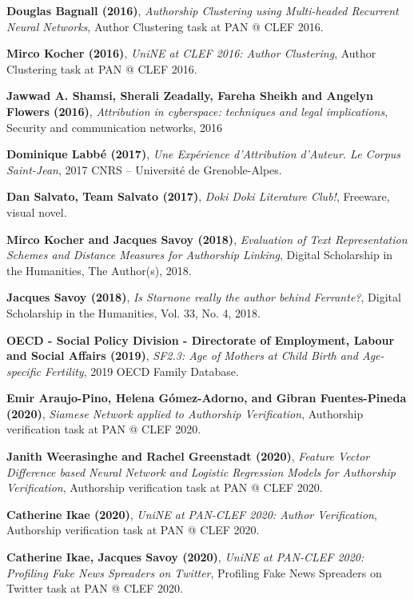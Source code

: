 \begin{thebibliography}{9}
\textbf{Douglas Bagnall (2016)},
\textit{Authorship Clustering using Multi-headed Recurrent Neural Networks},
Author Clustering task at PAN @ CLEF 2016.

\textbf{Mirco Kocher (2016)},
\textit{UniNE at CLEF 2016: Author Clustering},
Author Clustering task at PAN @ CLEF 2016.

\textbf{Jawwad A. Shamsi, Sherali Zeadally, Fareha Sheikh and Angelyn Flowers (2016)},
\textit{Attribution in cyberspace: techniques and legal implications},
Security and communication networks, 2016

\textbf{Dominique Labbé (2017)},
\textit{Une Expérience d’Attribution d’Auteur. Le Corpus Saint-Jean},
2017 CNRS – Université de Grenoble-Alpes.

\textbf{Dan Salvato, Team Salvato (2017)},
\textit{Doki Doki Literature Club!},
Freeware, visual novel.

\textbf{Mirco Kocher and Jacques Savoy (2018)},
\textit{Evaluation of Text Representation Schemes and Distance Measures for Authorship Linking},
Digital Scholarship in the Humanities, The Author(s), 2018.

\textbf{Jacques Savoy (2018)},
\textit{Is Starnone really the author behind Ferrante?},
Digital Scholarship in the Humanities, Vol. 33, No. 4, 2018.

\textbf{OECD - Social Policy Division - Directorate of Employment, Labour and Social Affairs (2019)},
\textit{SF2.3: Age of Mothers at Child Birth and Age-specific Fertility},
2019 OECD Family Database.

\textbf{Emir Araujo-Pino, Helena Gómez-Adorno, and Gibran Fuentes-Pineda (2020)},
\textit{Siamese Network applied to Authorship Verification},
Authorship verification task at PAN @ CLEF 2020.

\textbf{Janith Weerasinghe and Rachel Greenstadt (2020)},
\textit{Feature Vector Difference based Neural Network and Logistic Regression Models for Authorship Verification},
Authorship verification task at PAN @ CLEF 2020.

\textbf{Catherine Ikae (2020)},
\textit{UniNE at PAN-CLEF 2020: Author Verification},
Authorship verification task at PAN @ CLEF 2020.

\textbf{Catherine Ikae, Jacques Savoy (2020)},
\textit{UniNE at PAN-CLEF 2020: Profiling Fake News Spreaders on Twitter},
Profiling Fake News Spreaders on Twitter task at PAN @ CLEF 2020.


\end{thebibliography}
